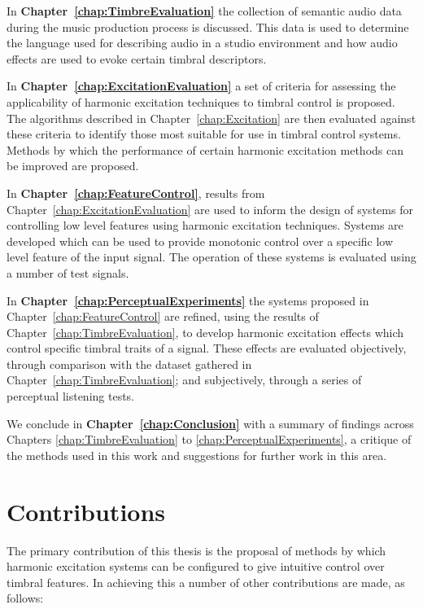 	In {\bf{Chapter~\ref{chap:TimbreEvaluation}}} the collection of semantic audio data during the music production
	process is discussed. This data is used to determine the language used for describing audio in a studio environment
	and how audio effects are used to evoke certain timbral descriptors.

	In {\bf{Chapter~\ref{chap:ExcitationEvaluation}}} a set of criteria for assessing the applicability of harmonic
	excitation techniques to timbral control is proposed. The algorithms described in Chapter~\ref{chap:Excitation} are
	then evaluated against these criteria to identify those most suitable for use in timbral control systems.  Methods
	by which the performance of certain harmonic excitation methods can be improved are proposed.

	In {\bf{Chapter~\ref{chap:FeatureControl}}}, results from Chapter~\ref{chap:ExcitationEvaluation} are used to inform
	the design of systems for controlling low level features using harmonic excitation techniques. Systems are developed
	which can be used to provide monotonic control over a specific low level feature of the input signal. The operation
	of these systems is evaluated using a number of test signals.

	In {\bf{Chapter~\ref{chap:PerceptualExperiments}}} the systems proposed in Chapter~\ref{chap:FeatureControl} are
	refined, using the results of Chapter~\ref{chap:TimbreEvaluation}, to develop harmonic excitation effects which
	control specific timbral traits of a signal. These effects are evaluated objectively, through comparison with the
	dataset gathered in Chapter~\ref{chap:TimbreEvaluation}; and subjectively, through a series of perceptual listening
	tests.

	We conclude in {\bf{Chapter~\ref{chap:Conclusion}}} with a summary of findings across Chapters
	\ref{chap:TimbreEvaluation} to \ref{chap:PerceptualExperiments}, a critique of the methods used in this work and
	suggestions for further work in this area.

\section{Contributions}
\label{sec:Introduction-Contributions}
	The primary contribution of this thesis is the proposal of methods by which harmonic excitation systems can be
	configured to give intuitive control over timbral features. In achieving this a number of other contributions are
	made, as follows:

